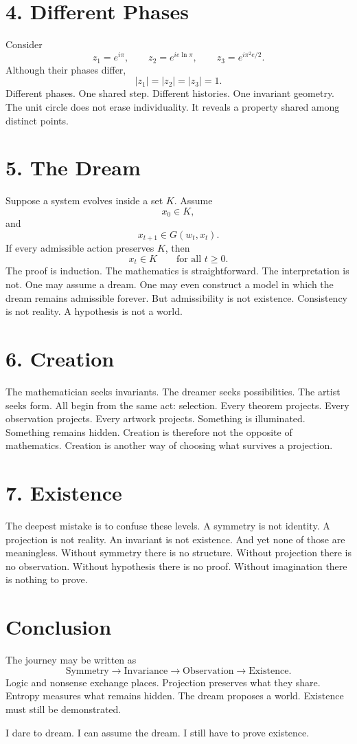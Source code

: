 \documentclass[12pt]{article}
\begin{document}
\section*{4. Different Phases}
Consider
\[
z_1=e^{i\pi}, \qquad z_2=e^{ie\ln\pi}, \qquad z_3=e^{i\pi^2e/2}.
\]
Although their phases differ,
\[
|z_1| = |z_2| = |z_3| = 1.
\]
Different phases. One shared step. Different histories. One invariant geometry. The unit circle does not erase individuality. It reveals a property shared among distinct points.
\section*{5. The Dream}
Suppose a system evolves inside a set \(K\). Assume
\[
x_0\in K,
\]
and
\[
x_{t+1}\in G(w_t,x_t).
\]
If every admissible action preserves \(K\), then
\[
x_t\in K \qquad \text{for all } t\ge0.
\]
The proof is induction. The mathematics is straightforward. The interpretation is not. One may assume a dream. One may even construct a model in which the dream remains admissible forever. But admissibility is not existence. Consistency is not reality. A hypothesis is not a world.
\section*{6. Creation}
The mathematician seeks invariants. The dreamer seeks possibilities. The artist seeks form. All begin from the same act: selection. Every theorem projects. Every observation projects. Every artwork projects. Something is illuminated. Something remains hidden. Creation is therefore not the opposite of mathematics. Creation is another way of choosing what survives a projection.
\section*{7. Existence}
The deepest mistake is to confuse these levels. A symmetry is not identity. A projection is not reality. An invariant is not existence. And yet none of those are meaningless. Without symmetry there is no structure. Without projection there is no observation. Without hypothesis there is no proof. Without imagination there is nothing to prove.
\section*{Conclusion}
The journey may be written as
\[
\text{Symmetry} \longrightarrow \text{Invariance} \longrightarrow \text{Observation} \longrightarrow \text{Existence}.
\]
Logic and nonsense exchange places. Projection preserves what they share. Entropy measures what remains hidden. The dream proposes a world. Existence must still be demonstrated.
\bigskip
\begin{center}
\Large
I dare to dream.
\medskip
I can assume the dream.
\medskip
I still have to prove existence.
\end{center}
\end{document}
